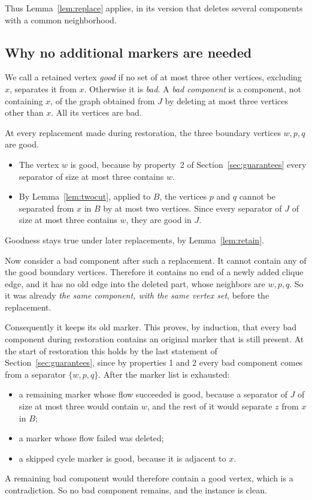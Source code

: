 \documentclass[11pt]{article}
\begin{document}
Thus Lemma~\ref{lem:replace} applies, in its version that deletes several
components with a common neighborhood.

\subsection{Why no additional markers are needed}\label{sec:markers}

We call a retained vertex \emph{good} if no set of at most three other
vertices, excluding $x$, separates it from $x$. Otherwise it is \emph{bad}. A
\emph{bad component} is a component, not containing $x$, of the graph obtained
from $J$ by deleting at most three vertices other than $x$. All its vertices
are bad.

At every replacement made during restoration, the three boundary vertices
$w,p,q$ are good.
\begin{itemize}[nosep]
\item The vertex $w$ is good, because by property~2 of
Section~\ref{sec:guarantees} every separator of size at most three contains
$w$.
\item By Lemma~\ref{lem:twocut}, applied to $B$, the vertices $p$ and $q$
cannot be separated from $x$ in $B$ by at most two vertices. Since every
separator of $J$ of size at most three contains $w$, they are good in $J$.
\end{itemize}
Goodness stays true under later replacements, by Lemma~\ref{lem:retain}.

Now consider a bad component after such a replacement. It cannot contain any of
the good boundary vertices. Therefore it contains no end of a newly added
clique edge, and it has no old edge into the deleted part, whose neighbors are
$w,p,q$. So it was already \emph{the same component, with the same vertex
set}, before the replacement.

Consequently it keeps its old marker. This proves, by induction, that every
bad component during restoration contains an original marker that is still
present. At the start of restoration this holds by the last statement of
Section~\ref{sec:guarantees}, since by properties 1 and 2 every bad component
comes from a separator $\{w,p,q\}$. After the marker list is exhausted:
\begin{itemize}[nosep]
\item a remaining marker whose flow succeeded is good, because a separator of
$J$ of size at most three would contain $w$, and the rest of it would
separate $z$ from $x$ in $B$;
\item a marker whose flow failed was deleted;
\item a skipped cycle marker is good, because it is adjacent to $x$.
\end{itemize}
A remaining bad component would therefore contain a good vertex, which is a
contradiction. So no bad component remains, and the instance is clean.
\end{document}
